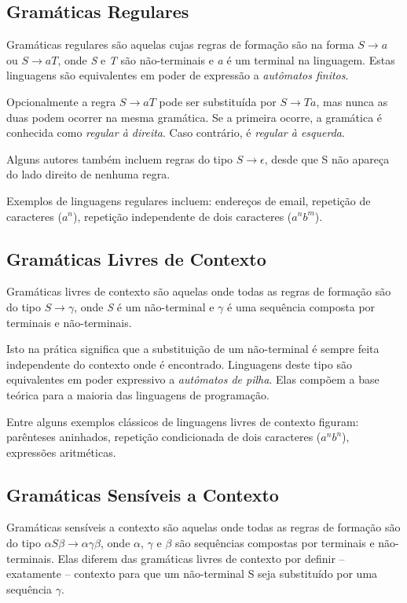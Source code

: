 \documentclass[a4paper,12pt,oneside,onecolumn]{uerj}
\begin{document}
\subsection{Gramáticas Regulares}

Gramáticas regulares são aquelas cujas regras de formação são na forma $S \rightarrow a$ ou $S \rightarrow aT$, onde \emph{S} e \emph{T} são não-terminais e \emph{a} é um terminal na linguagem. Estas linguagens são equivalentes em poder de expressão a \emph{autômatos finitos}. 

Opcionalmente a regra $S \rightarrow aT$ pode ser substituída por $S \rightarrow Ta$, mas nunca as duas podem ocorrer na mesma gramática. Se a primeira ocorre, a gramática é conhecida como \emph{regular à direita}. Caso contrário, é \emph{regular à esquerda}.

Alguns autores também incluem regras do tipo $S \rightarrow \epsilon$, desde que S não apareça do lado direito de nenhuma regra.

Exemplos de linguagens regulares incluem: endereços de email, repetição de caracteres ($a^n$), repetição independente de dois caracteres ($a^nb^m$).

\subsection{Gramáticas Livres de Contexto}

Gramáticas livres de contexto são aquelas onde todas as regras de formação são do tipo $S \rightarrow \gamma$, onde \emph{S} é um não-terminal e $\gamma$ é uma sequência composta por terminais e não-terminais. 

Isto na prática significa que a substituição de um não-terminal é sempre feita independente do contexto onde é encontrado. Linguagens deste tipo são equivalentes em poder expressivo a \emph{autômatos de pilha}. Elas compõem a base teórica para a maioria das linguagens de programação. 

Entre alguns exemplos clássicos de linguagens livres de contexto figuram: parênteses aninhados, repetição condicionada de dois caracteres ($a^nb^n$), expressões aritméticas.

\subsection{Gramáticas Sensíveis a Contexto}
Gramáticas sensíveis a contexto são aquelas onde todas as regras de formação são do tipo $\alpha S\beta\rightarrow \alpha\gamma\beta$, onde $\alpha$, $\gamma$ e $\beta$ são sequências compostas por terminais e não-terminais. Elas diferem das gramáticas livres de contexto por definir -- exatamente -- contexto para que um não-terminal S seja substituído por uma sequência $\gamma$. 
\end{document}

